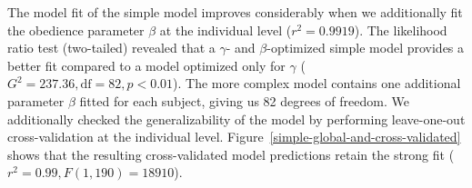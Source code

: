 \documentclass[11pt,a4paper]{article}
\begin{document}
%
%
%
% 
%
The model fit of the simple model improves considerably when we additionally fit the obedience parameter $\beta$ at the individual level ($r^2=0.9919$). 
The likelihood ratio test (two-tailed) revealed that a $\gamma$- and $\beta$-optimized simple model provides a better fit compared to a model optimized only for $\gamma$ ($G^2 = 237.36, \textrm{df} = 82, p < 0.01$). The more complex model contains one additional parameter $\beta$ fitted for each subject, giving us 82 degrees of freedom. We additionally checked the generalizability of the model by performing leave-one-out cross-validation at the individual level. Figure~\ref{simple-global-and-cross-validated} shows that the resulting cross-validated model predictions retain the strong fit ($r^2 = 0.99, F(1,190) = 18910$).

\end{document}

